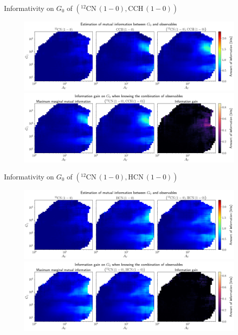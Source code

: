 \documentclass{beamer}
\begin{document}
\begin{frame}{Informativity on $G_0$ of $\left(\mathrm{^{12}CN\,(1-0)},\mathrm{CCH\,(1-0)}\right)$}
    \begin{figure}
        \centering
        \includegraphics[width=0.95\linewidth]{../mi/g0__12cn10_cch10_mi.png}
        \vfill
        \includegraphics[width=0.95\linewidth]{../mi/g0__12cn10_cch10_mi_gain.png}
    \end{figure}
\end{frame}

\begin{frame}{Informativity on $G_0$ of $\left(\mathrm{^{12}CN\,(1-0)},\mathrm{HCN\,(1-0)}\right)$}
    \begin{figure}
        \centering
        \includegraphics[width=0.95\linewidth]{../mi/g0__12cn10_hcn10_mi.png}
        \vfill
        \includegraphics[width=0.95\linewidth]{../mi/g0__12cn10_hcn10_mi_gain.png}
    \end{figure}
\end{frame}
\end{document}
